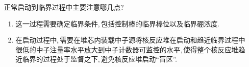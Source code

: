 \begin{exercise}
    正常启动到临界过程中主要注意哪几点?\,
    \begin{solution}
        \begin{enumerate}[(1)]
            \item 这一过程需要确定临界条件,\,包括控制棒的临界棒位以及临界硼浓度.\,
            \item 在启动过程中,\,需要在堆芯内装载中子源将核反应堆在启动和趋近临界过程中很低的中子注量率水平放大到中子计数器可监控的水平,\,使得整个核反应堆趋近临界的过程处于监督之下,\,避免核反应堆启动“盲区”.\,
        \end{enumerate}
    \end{solution}
\end{exercise}

